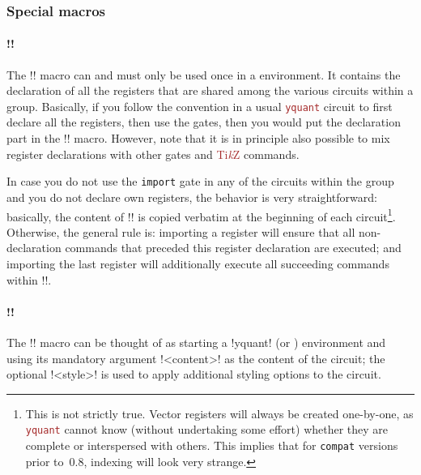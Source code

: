 \documentclass{scrartcl}
\def\TikZ{\textcolor{brown}{Ti\textit kZ}}
\def\pkg#1{\textcolor{brown}{\texttt{#1}}}
\def\ttlink{\link\texttt}
\def\texlink{\link\tex}
\def\Yquant{\pkg{yquant}}
\begin{document}
         \subsubsection{Special macros}
            \paragraph*{\tex!\registers!}
               The \tex!\registers! macro can and must only be used once in a \texlink{yquantgroup} environment.
               It contains the declaration of all the registers that are shared among the various circuits within a group.
               Basically, if you follow the convention in a usual \Yquant{} circuit to first declare all the registers, then use the gates, then you would put the declaration part in the \tex!\registers! macro.
               However, note that it is in principle also possible to mix register declarations with other gates and \TikZ{} commands.

               In case you do not use the \ttlink{import} gate in any of the circuits within the group and you do not declare own registers, the behavior is very straightforward: basically, the content of \tex!\registers! is copied verbatim at the beginning of each circuit\footnote{%
                  This is not strictly true.
                  Vector registers will always be created one\hyp by\hyp one, as \Yquant{} cannot know (without undertaking some effort) whether they are complete or interspersed with others.
                  This implies that for \ttlink{compat} versions prior to~0.8, indexing will look very strange.
               }.
               Otherwise, the general rule is: importing a register will ensure that all non\hyp declaration commands that preceded this register declaration are executed; and importing the last register will additionally execute all succeeding commands within \tex!\registers!.

            \paragraph*{\tex!!}
               The \tex!\circuit! macro can be thought of as starting a \tex!yquant! (or \texlink{yquant*}) environment and using its mandatory argument \tex!<content>! as the content of the circuit; the optional \tex!<style>! is used to apply additional styling options to the circuit.
\end{document}
